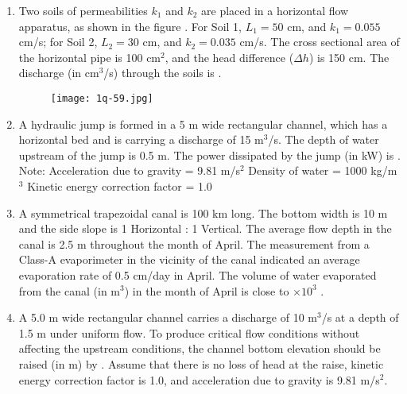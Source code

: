 \documentclass[journal,12pt,onecolumn]{article}
\theoremstyle{remark}
\begin{document}
\begin{enumerate}
\item Two soils of permeabilities $k_1$ and $k_2$ are placed in a horizontal flow apparatus, as shown in the figure . For Soil 1, $L_1 = 50$ cm, and $k_1 = 0.055$ cm/s; for Soil 2, $L_2 = 30$ cm, and $k_2 = 0.035$ cm/s. The cross sectional area of the horizontal pipe is 100 cm$^2$, and the head difference ($\Delta h$) is 150 cm. The discharge (in cm$^3$/s) through the soils is \underline{\hspace{2cm}} .
\begin{figure}[H]
    \centering
    \texttt{[image: 1q-59.jpg]}
    \caption{}
    \label{fig:q59}
\end{figure}

\hfill{}

\item A hydraulic jump is formed in a 5 m wide rectangular channel, which has a horizontal bed and is carrying a discharge of 15 m$^3$/s. The depth of water upstream of the jump is 0.5 m. The power dissipated by the jump (in kW) is \underline{\hspace{2cm}} .
Note:
Acceleration due to gravity = 9.81 m/s$^2$
Density of water = 1000 kg/m$^3$
Kinetic energy correction factor = 1.0

\hfill{}

\item A symmetrical trapezoidal canal is 100 km long. The bottom width is 10 m and the side slope is 1 Horizontal : 1 Vertical. The average flow depth in the canal is 2.5 m throughout the month of April. The measurement from a Class-A evaporimeter in the vicinity of the canal indicated an average evaporation rate of 0.5 cm/day in April.
The volume of water evaporated from the canal (in m$^3$) in the month of April is close to \underline{\hspace{2cm}} $\times 10^3$ .

\hfill{}

\item A 5.0 m wide rectangular channel carries a discharge of 10 m$^3$/s at a depth of 1.5 m under uniform flow. To produce critical flow conditions without affecting the upstream conditions, the channel bottom elevation should be raised (in m) by \underline{\hspace{2cm}} .
Assume that there is no loss of head at the raise, kinetic energy correction factor is 1.0, and acceleration due to gravity is 9.81 m/s$^2$.


\end{enumerate}
\end{document}
